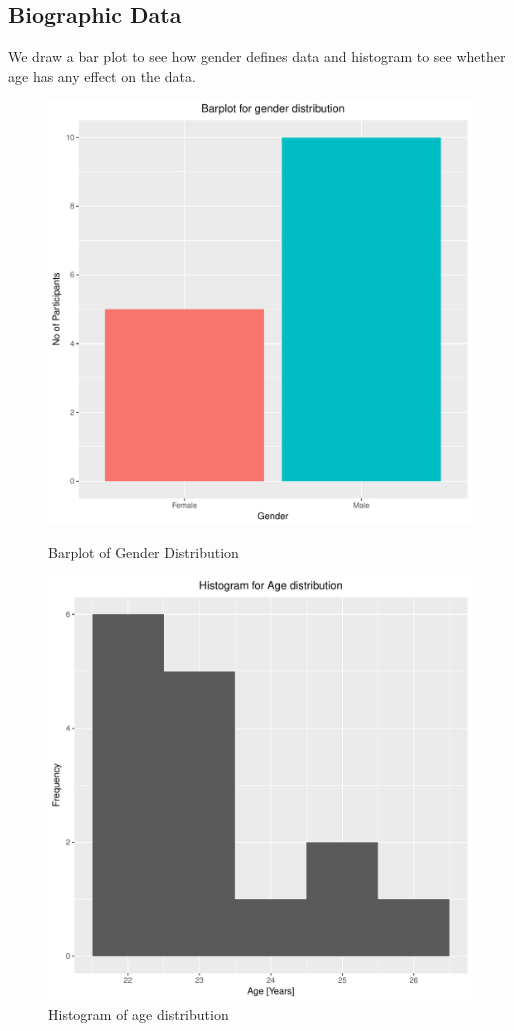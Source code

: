 \documentclass[12pt,epsf]{report}
\begin{document}
\subsection*{Biographic Data}
We draw a bar plot to see how gender defines data and histogram to see whether age has any effect on the data.\\
\begin{figure}[!htb]
	\begin{minipage}[c]{0.5\linewidth}
	\includegraphics[width=\linewidth]{1_gender.pdf}
	\caption{Barplot of Gender Distribution}
	\end{minipage}
	\hfill
	\begin{minipage}[c]{0.5\linewidth}
	\includegraphics[width=\linewidth]{1_age.pdf}
	\caption{Histogram of age distribution}
	\end{minipage}
\end{figure}
\end{document}
